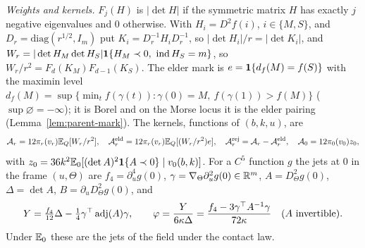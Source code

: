 \emph{Weights and kernels.} $F_j(H)$ is $|\det H|$ if the symmetric matrix $H$ has exactly $j$ negative eigenvalues and $0$ otherwise. With $H_i=D^2f(i)$, $i\in\{M,S\}$, and $D_r=\mathrm{diag}(r^{1/2},I_m)$ put $K_i=D_r^{-1}H_iD_r^{-1}$, so $|\det H_i|/r=|\det K_i|$, and $W_r=|\det H_M\det H_S|\ind\{H_M\prec0,\ \Ind H_S=m\}$, so $W_r/r^2=F_d(K_M)F_{d-1}(K_S)$. The elder mark is $e=\mathbf 1\{d_f(M)=f(S)\}$ with the maximin level $d_f(M)=\sup\{\min_tf(\gamma(t)):\gamma(0)=M,\ f(\gamma(1))>f(M)\}$ ($\sup\varnothing=-\infty$); it is Borel and on the Morse locus it is the elder pairing \cite{parentP} (Lemma~\ref{lem:parent-mark}). The kernels, functions of $(b,k,u)$, are
\begin{equation}\label{eq:third-kernels}
\mathcal A_r=12\pi_r(v_r)\mathbb E_Q[W_r/r^2],\quad \mathcal A_r^{\mathrm{eld}}=12\pi_r(v_r)\mathbb E_Q[(W_r/r^2)e],\quad \mathcal A^{\mathrm{rej}}_r=\mathcal A_r-\mathcal A^{\mathrm{eld}}_r,\quad \mathcal A_0=12\pi_0(v_0)z_0,
\end{equation}
with $z_0=36k^2\mathbb E_0[(\det A)^2\mathbf 1\{A\prec0\}\mid v_0(b,k)]$. For a $C^5$ function $g$ the jets at $0$ in the frame $(u,\Theta)$ are $f_4=\partial_u^4g(0)$, $\gamma=\nabla_\Theta\partial_u^2g(0)\in\mathbb R^m$, $A=D_\Theta^2g(0)$, $\Delta=\det A$, $B=\partial_uD_\Theta^2g(0)$, and
\begin{equation}\label{eq:third-Y}
Y=\tfrac{f_4}{12}\Delta-\tfrac14\gamma^\top\operatorname{adj}(A)\gamma,\qquad \varphi=\frac{Y}{6\kappa\Delta}=\frac{f_4-3\gamma^\top A^{-1}\gamma}{72\kappa}\quad(A\text{ invertible}).
\end{equation}
Under $\mathbb E_0$ these are the jets of the field under the contact law.

